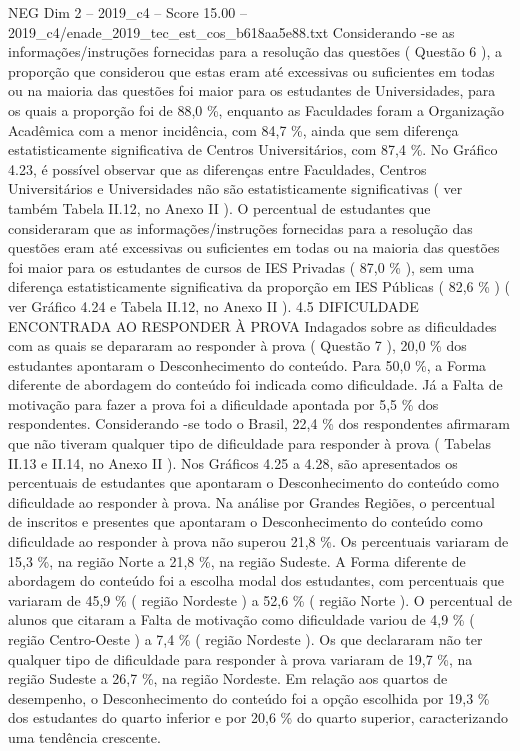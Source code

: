 \begin{textsample}{NEG Dim 2 – 2019\_c4 – Score 15.00 – 2019\_c4/enade\_2019\_tec\_est\_cos\_b618aa5e88.txt}
Considerando -se as informações/instruções fornecidas para a resolução das questões ( Questão 6 ), a proporção que considerou que estas eram até excessivas ou suficientes em todas ou na maioria das questões foi maior para os estudantes de Universidades, para os quais a proporção foi de 88,0 \%, enquanto as Faculdades foram a Organização Acadêmica com a menor incidência, com 84,7 \%, ainda que sem diferença estatisticamente significativa de Centros Universitários, com 87,4 \%.
No Gráfico 4.23, é possível observar que as diferenças entre Faculdades, Centros Universitários e Universidades não são estatisticamente significativas ( ver também Tabela II.12, no Anexo II ).
O percentual de estudantes que consideraram que as informações/instruções fornecidas para a resolução das questões eram até excessivas ou suficientes em todas ou na maioria das questões foi maior para os estudantes de cursos de IES Privadas ( 87,0 \% ), sem uma diferença estatisticamente significativa da proporção em IES Públicas ( 82,6 \% ) ( ver Gráfico 4.24 e Tabela II.12, no Anexo II ). 4.5 DIFICULDADE ENCONTRADA AO RESPONDER À PROVA Indagados sobre as dificuldades com as quais se depararam ao responder à prova ( Questão 7 ), 20,0 \% dos estudantes apontaram o Desconhecimento do conteúdo.
Para 50,0 \%, a Forma diferente de abordagem do conteúdo foi indicada como dificuldade.
Já a Falta de motivação para fazer a prova foi a dificuldade apontada por 5,5 \% dos respondentes.
Considerando -se todo o Brasil, 22,4 \% dos respondentes afirmaram que não tiveram qualquer tipo de dificuldade para responder à prova ( Tabelas II.13 e II.14, no Anexo II ).
Nos Gráficos 4.25 a 4.28, são apresentados os percentuais de estudantes que apontaram o Desconhecimento do conteúdo como dificuldade ao responder à prova.
Na análise por Grandes Regiões, o percentual de inscritos e presentes que apontaram o Desconhecimento do conteúdo como dificuldade ao responder à prova não superou 21,8 \%.
Os percentuais variaram de 15,3 \%, na região Norte a 21,8 \%, na região Sudeste.
A Forma diferente de abordagem do conteúdo foi a escolha modal dos estudantes, com percentuais que variaram de 45,9 \% ( região Nordeste ) a 52,6 \% ( região Norte ).
O percentual de alunos que citaram a Falta de motivação como dificuldade variou de 4,9 \% ( região Centro-Oeste ) a 7,4 \% ( região Nordeste ).
Os que declararam não ter qualquer tipo de dificuldade para responder à prova variaram de 19,7 \%, na região Sudeste a 26,7 \%, na região Nordeste.
Em relação aos quartos de desempenho, o Desconhecimento do conteúdo foi a opção escolhida por 19,3 \% dos estudantes do quarto inferior e por 20,6 \% do quarto superior, caracterizando uma tendência crescente.

\end{textsample}
